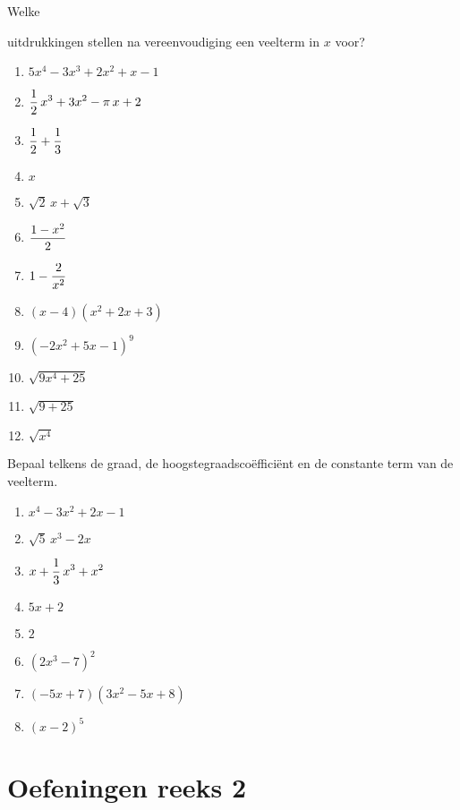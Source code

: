 \documentclass{ximera}
\begin{document}
\begin{Oefening}\setcounter{enumi}{3}
\hypertarget{oef1.3}{Welke} uitdrukkingen stellen na vereenvoudiging een veelterm in $x$ voor? 
\begin{multicols}{2}
\begin{enumerate}%
\item
$5x^4-3x^3+2x^2+x-1$
\item
$\displaystyle \frac{1}{2}\,x^3 + 3x^2-\pi\,x+2$
\item
$\displaystyle \frac{1}{2}+\frac{1}{3}$
\item
$x$
\item
$\sqrt{2}\,x + \sqrt{3}$
\item
$\displaystyle \frac{1-x^2}{2}$ 
\item
$\displaystyle 1-\frac{2}{x^2}$
\item
$(x-4)(x^2+2x+3)$
\item
$(-2x^2+5x-1)^{9}$
\item
$\sqrt{9x^4+25}$
\item
$\sqrt{9+25}$
\item
$\sqrt{x^4}$
\end{enumerate}
\end{multicols}
\end{Oefening}

\begin{Oefening} %
Bepaal telkens de graad, de hoogstegraadsco\"effici\"ent en de constante term van de veelterm.
\begin{multicols}{2}
\begin{enumerate}%
\item
$x^4-3x^2+2x-1$
\item
$\sqrt{5}\,x^3-2x$
\item
$\displaystyle x+\frac{1}{3}\,x^3+x^2$
\item
$5x+2$
\item
$2$
\item
$(2x^3-7)^2$
\item
$(-5x+7)(3x^2-5x+8)$
\item
$(x-2)^5$
\end{enumerate}
\end{multicols}
\end{Oefening}

\section*{Oefeningen reeks 2}
\end{document}
